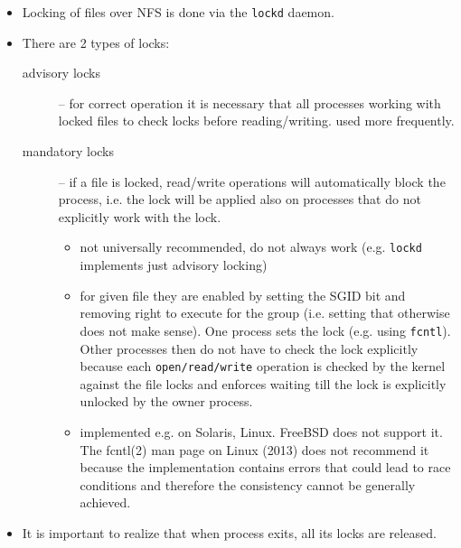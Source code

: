 \begin{itemize}
\item Locking of files over NFS is done via the \texttt{lockd} daemon.
\item There are 2 types of locks:
    \begin{description}
    \item [advisory locks] -- for correct operation it is necessary that all
    processes working with locked files to check locks before reading/writing.
    used more frequently.
    \item [mandatory locks] -- if a file is locked, read/write operations will
    automatically block the process, i.e. the lock will be applied also on
    processes that do not explicitly work with the lock.
        \begin{itemize}
	\label{MANDATORY}
	\item not universally recommended, do not always work
        (e.g. \texttt{lockd} implements just advisory locking)
	\item for given file they are enabled by setting the SGID bit and
        removing right to execute for the group
	(i.e. setting that otherwise does not make sense).
	One process sets the lock (e.g. using \texttt{fcntl}). Other processes
	then do not have to check the lock explicitly because each
	\texttt{open/read/write} operation is checked by the kernel against
	the file locks and enforces waiting till the lock is explicitly
	unlocked by the owner process.\\
	\item implemented e.g. on Solaris, Linux. FreeBSD does not support it.
	The fcntl(2) man page on Linux (2013) does not recommend it because
	the implementation contains errors that could lead to race conditions
	and therefore the consistency cannot be generally achieved.
        \end{itemize}
    \end{description}
\item It is important to realize that when process exits, all its locks are
released.
\end{itemize}



